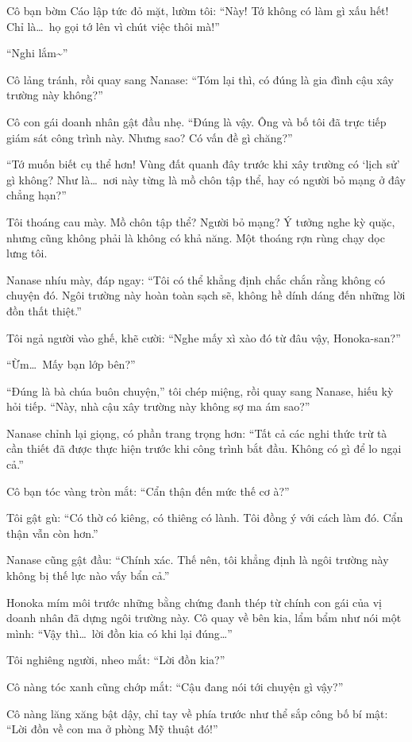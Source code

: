 \documentclass[../main.tex]{subfiles}
\begin{document}
Cô bạn bờm Cáo lập tức đỏ mặt, lườm tôi: ``Này! Tớ không có làm gì xấu hết! Chỉ là\dots\ họ gọi tớ lên vì chút việc thôi mà!''

``Nghi lắm\~{}''

Cô lảng tránh, rồi quay sang Nanase: ``Tóm lại thì, có đúng là gia đình cậu xây trường này không?''

Cô con gái doanh nhân gật đầu nhẹ. ``Đúng là vậy. Ông và bố tôi đã trực tiếp giám sát công trình này. Nhưng sao? Có vấn đề gì chăng?''

``Tớ muốn biết cụ thể hơn! Vùng đất quanh đây trước khi xây trường có `lịch sử' gì không? Như là\dots\ nơi này từng là mồ chôn tập thể, hay có người bỏ mạng ở đây chẳng hạn?''

Tôi thoáng cau mày. Mồ chôn tập thể? Người bỏ mạng? Ý tưởng nghe kỳ quặc, nhưng cũng không phải là không có khả năng. Một thoáng rợn rùng chạy dọc lưng tôi.

Nanase nhíu mày, đáp ngay: ``Tôi có thể khẳng định chắc chắn rằng không có chuyện đó. Ngôi trường này hoàn toàn sạch sẽ, không hề dính dáng đến những lời đồn thất thiệt.''

Tôi ngả người vào ghế, khẽ cười: ``Nghe mấy xì xào đó từ đâu vậy, Honoka-san?''

``Ừm\dots\ Mấy bạn lớp bên?''

``Đúng là bà chúa buôn chuyện,'' tôi chép miệng, rồi quay sang Nanase, hiếu kỳ hỏi tiếp. ``Này, nhà cậu xây trường này không sợ ma ám sao?''

Nanase chỉnh lại giọng, có phần trang trọng hơn: ``Tất cả các nghi thức trừ tà cần thiết đã được thực hiện trước khi công trình bắt đầu. Không có gì để lo ngại cả.''

Cô bạn tóc vàng tròn mắt: ``Cẩn thận đến mức thế cơ à?''

Tôi gật gù: ``Có thờ có kiêng, có thiêng có lành. Tôi đồng ý với cách làm đó. Cẩn thận vẫn còn hơn.''

Nanase cũng gật đầu: ``Chính xác. Thế nên, tôi khẳng định là ngôi trường này không bị thế lực nào vấy bẩn cả.''

Honoka mím môi trước những bằng chứng đanh thép từ chính con gái của vị doanh nhân đã dựng ngôi trường này. Cô quay về bên kia, lẩm bẩm như nói một mình: ``Vậy thì\dots\ lời đồn kia có khi lại đúng\dots''

Tôi nghiêng người, nheo mắt: ``Lời đồn kia?''

Cô nàng tóc xanh cũng chớp mắt: ``Cậu đang nói tới chuyện gì vậy?''

Cô nàng lăng xăng bật dậy, chỉ tay về phía trước như thể sắp công bố bí mật: ``Lời đồn về con ma ở phòng Mỹ thuật đó!''
\end{document}
